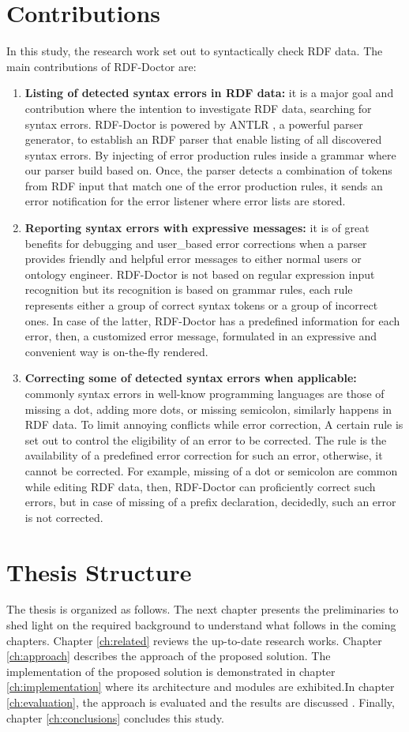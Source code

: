 \section {Contributions}
In this study, the research work set out to syntactically check RDF data. 
The main contributions of RDF-Doctor are:
\begin{enumerate}
	\item  {\bf Listing of detected syntax errors in RDF data:} it is a major goal and contribution where the intention to investigate RDF data, searching for syntax errors. RDF-Doctor is powered by ANTLR \cite{ANTLR:Website:Online}, a powerful parser generator, to establish an RDF parser that enable listing of all discovered syntax errors. By injecting of error production rules inside a grammar where our parser build based on. Once, the parser detects a combination of tokens from RDF input that match one of the error production rules, it sends an error notification for the error listener where error lists are stored.
	\item {\bf Reporting syntax errors with expressive messages:} it is of great benefits for debugging and user\_based error corrections when a parser provides friendly and helpful error messages to either normal users or ontology engineer. RDF-Doctor is not based on regular expression input recognition but its recognition is based on grammar rules, each rule represents either a group of correct syntax tokens or a group of incorrect ones. In case of the latter, RDF-Doctor has a predefined information for each error, then,  a customized error message, formulated in an expressive and convenient way is on-the-fly rendered.  
	\item {\bf Correcting some of detected syntax errors when applicable:} commonly syntax errors in well-know programming languages are those of missing a dot, adding more dots, or missing semicolon, similarly happens in RDF data. To limit annoying conflicts while error correction, A certain rule is set out to control the eligibility of an error to be corrected. The rule is the availability of a predefined error correction for such an error, otherwise, it cannot be corrected. For example, missing of a dot or semicolon are common while editing RDF data, then, RDF-Doctor can proficiently correct such errors, but in case of missing of a prefix declaration, decidedly, such an error is not corrected.     
\end{enumerate}

\section {Thesis Structure}
The thesis is organized as follows. The next chapter presents the preliminaries to shed light on the required background to understand what follows in the coming chapters. Chapter \ref{ch:related} reviews the up-to-date research works. Chapter \ref{ch:approach} describes the approach of the proposed solution. The implementation of the proposed solution is demonstrated in chapter \ref{ch:implementation} where its architecture and modules are exhibited.In chapter \ref{ch:evaluation}, the approach is evaluated  and the results are discussed . Finally, chapter
\ref{ch:conclusions} concludes this study.




